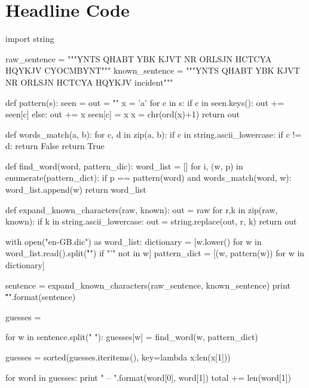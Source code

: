 \documentclass[11pt,a4paper,twoside]{article}
\begin{document}
\section{Headline Code}
\label{headline_code}
\begin{python}
import string


raw_sentence =   """YNTS QHABT YBK KJVT NR ORLSJN 
                 HCTCYA HQYKJV CYOCMBYNT"""
known_sentence = """YNTS QHABT YBK KJVT NR ORLSJN 
                 HCTCYA HQYKJV incident"""


def pattern(s):
    seen = {}
    out = ""
    x = 'a'
    for c in s:
        if c in seen.keys():
            out += seen[c]
        else:
            out += x
            seen[c] = x
            x = chr(ord(x)+1)
    return out

def words_match(a, b):
    for c, d in zip(a, b):
        if c in string.ascii_lowercase:
            if c != d:
                return False
    return True

def find_word(word, pattern_dic):
    word_list = []
    for i, (w, p) in enumerate(pattern_dict):
        if p == pattern(word) and words_match(word, w):
            word_list.append(w)
    return word_list

def expand_known_characters(raw, known):
    out = raw
    for r,k in zip(raw, known): 
      if k in string.ascii_lowercase:
          out = string.replace(out, r, k)
    return out

with open("en-GB.dic") as word_list:
    dictionary = [w.lower() for w 
                  in word_list.read().split("\r\n") 
                  if "'" not in w]
    pattern_dict = [(w, pattern(w)) for w in dictionary]

sentence = expand_known_characters(raw_sentence, 
                                   known_sentence)
print "\"{}\"\n".format(sentence)

guesses = {}

for w in sentence.split(" "):
    guesses[w] = find_word(w, pattern_dict)

guesses = sorted(guesses.iteritems(), key=lambda x:len(x[1]))

for word in guesses:
    print "{} -- {}\n".format(word[0], word[1])
    total += len(word[1])
\end{python}
\end{document}
